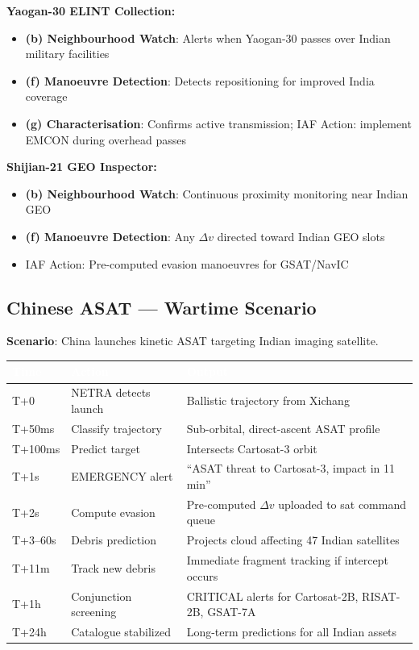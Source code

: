 \documentclass[11pt,a4paper]{article}
\newcommand{\TH}[1]{\textcolor{white}{\textbf{#1}}}
\begin{document}
\textbf{Yaogan-30 ELINT Collection:}
\begin{itemize}[noitemsep]
  \item \textbf{(b) Neighbourhood Watch}: Alerts when Yaogan-30 passes over Indian military facilities
  \item \textbf{(f) Manoeuvre Detection}: Detects repositioning for improved India coverage
  \item \textbf{(g) Characterisation}: Confirms active transmission; IAF Action: implement EMCON during overhead passes
\end{itemize}

\textbf{Shijian-21 GEO Inspector:}
\begin{itemize}[noitemsep]
  \item \textbf{(b) Neighbourhood Watch}: Continuous proximity monitoring near Indian GEO
  \item \textbf{(f) Manoeuvre Detection}: Any $\Delta v$ directed toward Indian GEO slots
  \item IAF Action: Pre-computed evasion manoeuvres for GSAT/NavIC
\end{itemize}

\subsection{Chinese ASAT --- Wartime Scenario}

\textbf{Scenario}: China launches kinetic ASAT targeting Indian imaging satellite.

\begin{table}[H]\centering\small
\begin{tabularx}{\textwidth}{|p{1.8cm}|p{4cm}|X|}
\hline
\rowcolor{dblue}\TH{Time} & \TH{Action} & \TH{Output} \\
\hline
T+0 & NETRA detects launch & Ballistic trajectory from Xichang \\
\hline
T+50ms & Classify trajectory & Sub-orbital, direct-ascent ASAT profile \\
\hline
T+100ms & Predict target & Intersects Cartosat-3 orbit \\
\hline
T+1s & EMERGENCY alert & ``ASAT threat to Cartosat-3, impact in 11 min'' \\
\hline
T+2s & Compute evasion & Pre-computed $\Delta v$ uploaded to sat command queue \\
\hline
T+3--60s & Debris prediction & Projects cloud affecting 47 Indian satellites \\
\hline
T+11m & Track new debris & Immediate fragment tracking if intercept occurs \\
\hline
T+1h & Conjunction screening & CRITICAL alerts for Cartosat-2B, RISAT-2B, GSAT-7A \\
\hline
T+24h & Catalogue stabilized & Long-term predictions for all Indian assets \\
\hline
\end{tabularx}
\end{table}
\end{document}
